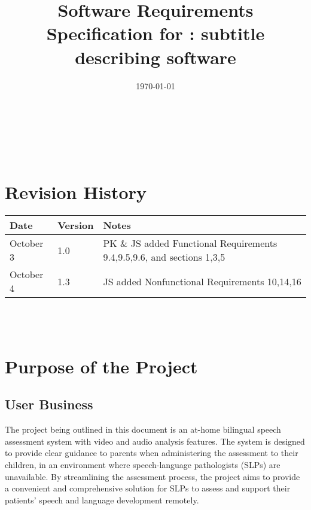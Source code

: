 \documentclass[12pt]{article}
\begin{document}
\title{Software Requirements Specification for \progname: subtitle describing software} 
\author{\authname}
\date{\today}
	
\maketitle

~\newpage


\tableofcontents

~\newpage

\section*{Revision History}

\begin{tabularx}{\textwidth}{p{3cm}p{2cm}X}
\toprule {\textbf{Date}} & {\textbf{Version}} & {\textbf{Notes}}\\
\midrule
October 3 & 1.0 & PK \& JS added Functional Requirements 9.4,9.5,9.6, and sections 1,3,5\\
October 4 & 1.3 & JS added Nonfunctional Requirements 10,14,16\\
\bottomrule
\end{tabularx}

~\\

~\newpage
\section{Purpose of the Project}
\subsection{User Business}
\hspace{2em}The project being outlined in this document is an at-home bilingual speech 
assessment system with video and audio analysis features. The system is designed 
to provide clear guidance to parents when administering the assessment to their 
children, in an environment where speech-language pathologists (SLPs) are 
unavailable. By streamlining the assessment process, the project aims to provide a 
convenient and comprehensive solution for SLPs to assess and support their patients'
speech and language development remotely. 
\end{document}

